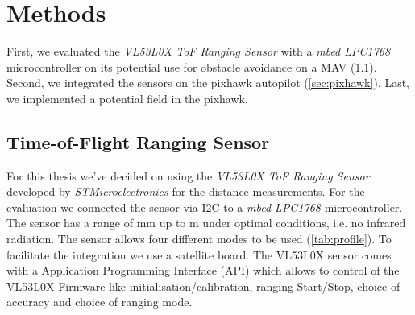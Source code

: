 \chapter{Methods}
\label{ch:methodsff}
First, we evaluated the \textit{VL53L0X ToF Ranging Sensor} with a \textit{mbed LPC1768} microcontroller on its potential use for obstacle avoidance on a MAV (\cref{sec:tof}). Second, we integrated the sensors on the pixhawk autopilot (\cref{sec:pixhawk}). Last, we implemented a potential field in the pixhawk.
\section{Time-of-Flight Ranging Sensor}
\label{sec:tof}
For this thesis we've decided on using the \textit{VL53L0X ToF Ranging Sensor} developed by \textit{STMicroelectronics} for the distance measurements. For the evaluation we connected the sensor via I2C to a \textit{mbed LPC1768} microcontroller. The sensor has a range of \unit[0]{mm} up to \unit[2]{m} under optimal conditions, i.e. no infrared radiation. The sensor allows four different modes to be used (\cref{tab:profile}). To facilitate the integration we use a satellite board. The VL53L0X sensor comes with a Application Programming Interface (API) which allows to control of the VL53L0X Firmware like initialisation/calibration, ranging Start/Stop, choice of accuracy and choice of ranging mode.




